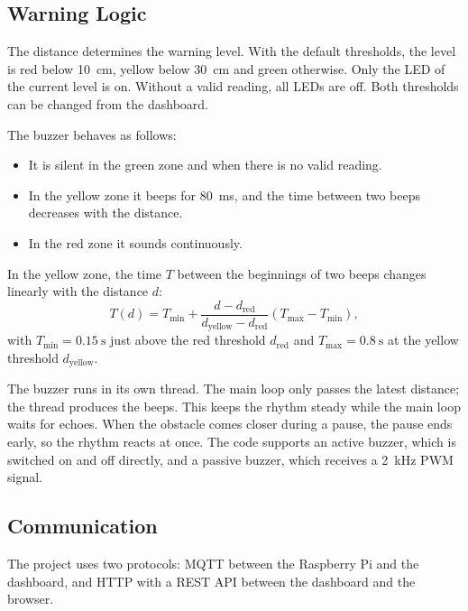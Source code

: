 \documentclass[11pt,a4paper]{article}
\begin{document}
\subsection{Warning Logic}
\label{sec:warning}
The distance determines the warning level. With the default thresholds, the level
is red below \qty{10}{\centi\metre}, yellow below \qty{30}{\centi\metre} and
green otherwise. Only the LED of the current level is on. Without a valid
reading, all LEDs are off. Both thresholds can be changed from the dashboard.

The buzzer behaves as follows:
\begin{itemize}
  \item It is silent in the green zone and when there is no valid reading.
  \item In the yellow zone it beeps for \qty{80}{\milli\second}, and the time
        between two beeps decreases with the distance.
  \item In the red zone it sounds continuously.
\end{itemize}
In the yellow zone, the time $T$ between the beginnings of two beeps changes
linearly with the distance $d$:
\begin{equation}
  T(d) = T_\text{min} + \frac{d - d_\text{red}}{d_\text{yellow} - d_\text{red}}
         \left(T_\text{max} - T_\text{min}\right),
  \label{eq:beep}
\end{equation}
with $T_\text{min} = \qty{0.15}{\second}$ just above the red threshold
$d_\text{red}$ and $T_\text{max} = \qty{0.8}{\second}$ at the yellow threshold
$d_\text{yellow}$.

The buzzer runs in its own thread. The main loop only passes the latest
distance; the thread produces the beeps. This keeps the rhythm steady while the
main loop waits for echoes. When the obstacle comes closer during a pause, the
pause ends early, so the rhythm reacts at once. The code supports an active
buzzer, which is switched on and off directly, and a passive buzzer, which
receives a \qty{2}{\kilo\hertz} PWM signal.

\subsection{Communication}
\label{sec:communication}
The project uses two protocols: MQTT between the Raspberry Pi and the dashboard,
and HTTP with a REST API between the dashboard and the browser.
\end{document}
